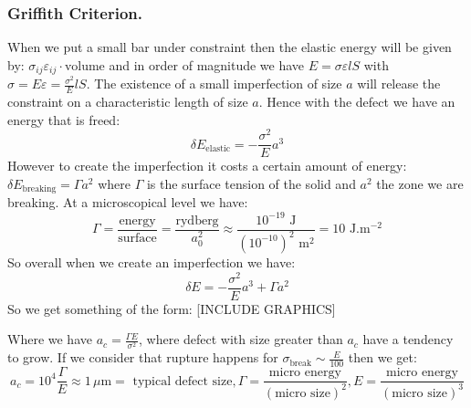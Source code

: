 \documentclass[10pt,a4paper]{book}
\begin{document}
\subsubsection{Griffith Criterion.}
When we put a small bar under constraint then the elastic energy will be given by: $\sigma_{ij} \varepsilon_{ij} \cdot \text{volume}$ and in order of magnitude we have $E = \sigma \varepsilon l S$ with $\sigma = E \varepsilon = \frac{\sigma^2}{E} l S$. The existence of a small imperfection of size $a$ will release the constraint on a characteristic length of size $a$. Hence with the defect we have an energy that is freed:
\[
\delta E_\text{elastic} = - \frac{\sigma^2}{E} a^3
\]
However to create the imperfection it costs a certain amount of energy: $\delta E_\text{breaking} = \Gamma a^2$ where $\Gamma$ is the surface tension of the solid and $a^2$ the zone we are breaking. At a microscopical level we have:
\[
\Gamma = \frac{\text{energy}}{\text{surface}} = \frac{\text{rydberg}}{a_0^2} \approx \frac{10^{-19} \text{ J}}{(10^{-10})^2 \text{ m}^2} = 10 \text{ J}.\text{m}^{-2}
\]
So overall when we create an imperfection we have:
\[
\delta E = - \frac{\sigma^2}{E} a^3 + \Gamma a^2
\]
So we get something of the form:
[INCLUDE GRAPHICS]

Where we have $a_c = \frac{\Gamma E}{\sigma^2}$, where defect with size greater than $a_c$ have a tendency to grow. If we consider that rupture happens for $\sigma_\text{break} \sim \frac{E}{100}$ then we get:
\[
a_c = 10^4 \frac{\Gamma}{E} \approx 1 \, \mu\text{m} = \text{ typical defect size}, \Gamma = \frac{\text{micro energy}}{(\text{micro size})^2}, E = \frac{\text{micro energy}}{(\text{micro size})^3}
\]
\end{document}
